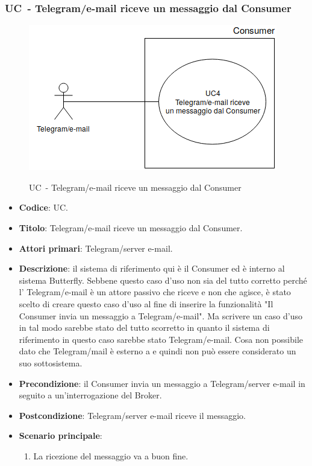 \subsubsection{UC\theuccount\ - Telegram/e-mail riceve un messaggio dal Consumer}
	\begin{figure}[H]
		\centering
			\includegraphics[width=0.7\columnwidth]{img/UC4.png}\\
		\caption{UC\theuccount\ - Telegram/e-mail riceve un messaggio dal Consumer}
	\end{figure}
	\begin{itemize}
		\item \textbf{Codice}: UC\theuccount.
		\item \textbf{Titolo}: Telegram/e-mail riceve un messaggio dal Consumer.
		\item \textbf{Attori primari}: Telegram/server e-mail.
		\item \textbf{Descrizione}: il sistema di riferimento qui è il Consumer ed è interno al sistema Butterfly.
		Sebbene questo caso d'uso non sia del tutto corretto perché l' Telegram/e-mail è un attore passivo che riceve e non che agisce, è stato scelto di creare questo caso d'uso al fine di inserire la funzionalità "Il Consumer invia un messaggio a Telegram/e-mail". Ma scrivere un caso d'uso in tal modo sarebbe stato del tutto scorretto in quanto il sistema di riferimento in questo caso sarebbe stato Telegram/e-mail. Cosa non possibile dato che Telegram/mail è esterno a \progetto e quindi non può essere considerato un suo sottosistema.
		\item \textbf{Precondizione}: il Consumer invia un messaggio a Telegram/server e-mail in seguito a un'interrogazione del Broker.
		\item \textbf{Postcondizione}: Telegram/server e-mail riceve il messaggio.
		\item \textbf{Scenario principale}:
		\begin{enumerate}
			\item La ricezione del messaggio va a buon fine.
		\end{enumerate} 
	\end{itemize}

